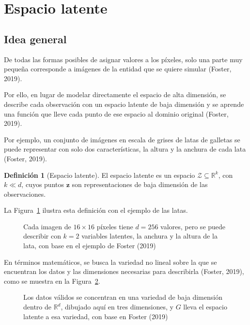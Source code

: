 \documentclass[11pt,letterpaper]{article}
\theoremstyle{definition}
\newtheorem{definicion}{Definición}
\newcommand{\bz}{\mathbf{z}}
\begin{document}
\section{Espacio latente}

\subsection{Idea general}

De todas las formas posibles de asignar valores a los píxeles, solo una parte muy pequeña corresponde a imágenes de la entidad que se quiere simular (Foster, 2019).

Por ello, en lugar de modelar directamente el espacio de alta dimensión, se describe cada observación con un espacio latente de baja dimensión y se aprende una función que lleve cada punto de ese espacio al dominio original (Foster, 2019).

Por ejemplo, un conjunto de imágenes en escala de grises de latas de galletas se puede representar con solo dos características, la altura y la anchura de cada lata (Foster, 2019).

\begin{definicion}[Espacio latente]
El espacio latente es un espacio $\mathcal{Z} \subseteq \mathbb{R}^k$, con $k \ll d$, cuyos puntos $\bz$ son representaciones de baja dimensión de las observaciones.
\end{definicion}

La Figura~\ref{fig:latas} ilustra esta definición con el ejemplo de las latas.

\begin{figure}[H]
  \centering
  
  \caption{Cada imagen de $16 \times 16$ píxeles tiene $d = 256$ valores, pero se puede describir con $k = 2$ variables latentes, la anchura y la altura de la lata, con base en el ejemplo de Foster (2019)}
  \label{fig:latas}
\end{figure}

En términos matemáticos, se busca la variedad no lineal sobre la que se encuentran los datos y las dimensiones necesarias para describirla (Foster, 2019), como se muestra en la Figura~\ref{fig:variedad}.

\begin{figure}[H]
  \centering
  
  \caption{Los datos válidos se concentran en una variedad de baja dimensión dentro de $\mathbb{R}^{d}$, dibujado aquí en tres dimensiones, y $G$ lleva el espacio latente a esa variedad, con base en Foster (2019)}
  \label{fig:variedad}
\end{figure}
\end{document}
